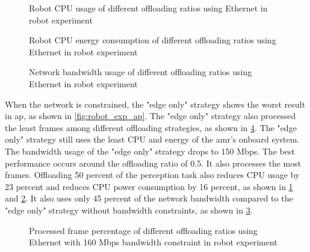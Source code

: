 \begin{figure}
    \centering
    
    \caption{Robot CPU usage of different offloading ratios using Ethernet in robot experiment}
    \label{fig:robot_exp_cpu_usage}
\end{figure}


\begin{figure}
    \centering
    
    \caption{Robot CPU energy consumption of different offloading ratios using Ethernet in robot experiment}
    \label{fig:robot_exp_energy}
\end{figure}

\begin{figure}
    \centering
    
    \caption{Network bandwidth usage of different offloading ratios using Ethernet in robot experiment}
    \label{fig:robot_exp_network_bandwidth}
\end{figure}

When the network is constrained, the "edge only" strategy shows the worst result in \gls{ap}, as shown in \cref{fig:robot_exp_ap}. The "edge only" strategy also processed the least frames among different offloading strategies, as shown in \cref{fig:robot_exp_processed_frame_percentage_160}. The "edge only" strategy still uses the least CPU and energy of the \gls{amr}'s onboard system. The bandwidth usage of the "edge only" strategy drops to 150 Mbps. The best performance occurs around the offloading ratio of 0.5. It also processes the most frames. Offloading 50 percent of the perception task also reduces CPU usage by 23 percent and reduces CPU power consumption by 16 percent, as shown in \cref{fig:robot_exp_cpu_usage} and \cref{fig:robot_exp_energy}. It also uses only 45 percent of the network bandwidth compared to the "edge only" strategy without bandwidth constraints, as shown in \cref{fig:robot_exp_network_bandwidth}. 

\begin{figure}
    \centering
        
    \caption{Processed frame percentage of different offloading ratios using Ethernet with 160 Mbps bandwidth constraint in robot experiment}
    \label{fig:robot_exp_processed_frame_percentage_160}
\end{figure}

